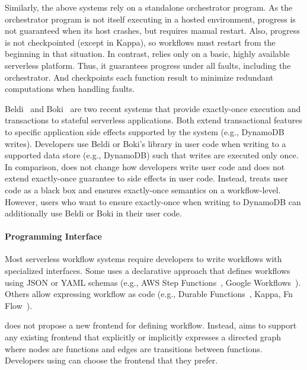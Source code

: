 Similarly, the above systems rely on a standalone orchestrator program. As the
orchestrator program is not itself executing in a hosted environment, progress
is not guaranteed when its host crashes, but requires manual restart. Also,
progress is not checkpointed (except in Kappa), so workflows must restart from
the beginning in that situation. In contrast, \name{} relies only on a basic,
highly available serverless platform. Thus, it guarantees progress under all
faults, including the orchestrator. And \name{} checkpoints each function
result to minimize redundant computations when handling faults.

Beldi~\cite{beldi} and Boki~\cite{boki} are two recent systems that provide
exactly-once execution and transactions to stateful serverless applications.
Both extend transactional features to specific application side effects
supported by the system (e.g., DynamoDB writes). Developers use Beldi or
Boki's library in user code when writing to a supported data store (e.g.,
DynamoDB) such that writes are executed only once. In comparison, \name{} does
not change how developers write user code and does not extend exactly-once
guarantee to side effects in user code. Instead, \name{} treats user code as a
black box and ensures exactly-once semantics on a workflow-level. However,
\name{} users who want to ensure exactly-once when writing to DynamoDB can
additionally use Beldi or Boki in their user code.

\paragraph{Programming Interface}

Most serverless workflow systems require developers to write workflows with
specialized interfaces. Some uses a declarative approach that defines
workflows using JSON or YAML schemas (e.g., AWS Step
Functions~\cite{aws-step-functions}, Google
Workflows~\cite{google-workflows}). Others allow expressing workflow as code
(e.g., Durable Functions~\cite{durable-functions}, Kappa\cite{kappa}, Fn
Flow~\cite{fn-flow}).

\name{} does not propose a new frontend for defining workflow. Instead,
\name{} aims to support any existing frontend that explicitly or implicitly
expresses a directed graph where nodes are functions and edges are transitions
between functions. Developers using \name{} can choose the frontend that they
prefer.



